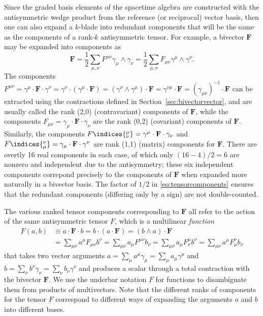 \documentclass[1p,sort&compress]{elsarticle}
\numberwithin{equation}{section}
\newcommand{\bv}[1]{\mathbf{#1}}
\begin{document}
Since the graded basis elements of the spacetime algebra are constructed with the antisymmetric wedge product from the reference (or reciprocal) vector basis, then one can also expand a $k$-blade into redundant components that will be the same as the components of a rank-$k$ antisymmetric tensor.  For example, a bivector $\bv{F}$ may be expanded into components as 
\begin{equation}\label{eq:tensorcomponents}
  \bv{F} = \frac{1}{2}\sum_{\mu,\nu}F^{\mu\nu}\gamma_\mu\wedge\gamma_\nu = \frac{1}{2}\sum_{\mu,\nu} F_{\mu\nu} \gamma^\mu\wedge\gamma^\nu.
\end{equation}
The components $F^{\mu\nu} = \gamma^\mu \cdot \bv{F} \cdot \gamma^\nu = \gamma^\nu \cdot (\gamma^\mu \cdot \bv{F}) = (\gamma^\nu\wedge\gamma^\mu)\cdot \bv{F} = \gamma^{\nu\mu} \cdot \bv{F} = (\gamma_{\mu\nu})^{-1} \cdot \bv{F}$ can be extracted using the contractions defined in Section~\ref{sec:bivectorvector}, and are usually called the rank (2,0) (contravariant) components of $\bv{F}$, while the components $F_{\mu\nu} = \gamma_\mu \cdot \bv{F} \cdot \gamma_\nu$ are the rank (0,2) (covariant) components of $\bv{F}$.  Similarly, the components $F\indices{^\mu_\nu} = \gamma^\mu \cdot \bv{F} \cdot \gamma_\nu$ and $F\indices{_\mu^\nu} = \gamma_\mu \cdot \bv{F} \cdot \gamma^\nu$ are rank (1,1) (matrix) components for $\bv{F}$.  There are overtly 16 real components in each case, of which only $(16 - 4)/2 = 6$ are nonzero and independent due to the antisymmetry; these six independent components correpond precisely to the components of $\bv{F}$ when expanded more naturally in a bivector basis.  The factor of $1/2$ in \eqref{eq:tensorcomponents} ensures that the redundant components (differing only by a sign) are not double-counted.

The various ranked tensor components corresponding to $\bv{F}$ all refer to the action of the same antisymmetric tensor $\underbar{F}$, which is a multilinear \emph{function}
\begin{align} 
  \underbar{F}(a,b) &\equiv a \cdot \bv{F} \cdot b = b \cdot (a \cdot \bv{F}) = (b\wedge a) \cdot \bv{F} \\
  &= \sum_{\mu\nu} a^\mu F_{\mu\nu} b^\nu = \sum_{\mu\nu} a_\mu F^{\mu\nu} b_\nu = \sum_{\mu\nu} a_\mu F^\mu_\nu b^\nu = \sum_{\mu\nu} a^\mu F_\mu^\nu b_\nu  \nonumber
\end{align}
that takes two vector arguments $a = \sum_\mu a^\mu \gamma_\mu = \sum_\mu a_\mu \gamma^\mu$ and $b = \sum_\nu b^\nu \gamma_\nu = \sum_\nu b_\nu \gamma^\nu$ and produces a scalar through a total contraction with the bivector $\bv{F}$.  We use the underbar notation $\underbar{F}$ for functions to disambiguate them from products of multivectors.  Note that the different ranks of components for the tensor $\underbar{F}$ correspond to different ways of expanding the arguments $a$ and $b$ into different bases.  
\end{document}
